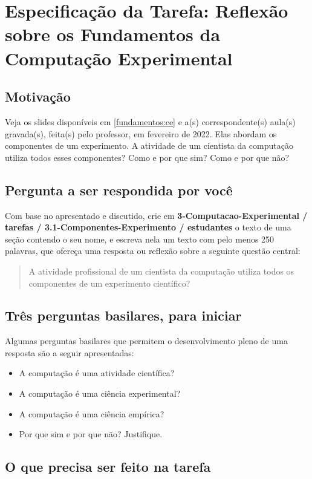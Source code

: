 \section{Especificação da Tarefa: Reflexão sobre os Fundamentos da Computação Experimental}

\subsection{Motivação}

Veja os slides disponíveis em \ref{fundamentos:ce} e a(s) correspondente(s) aula(s) gravada(s), feita(s) pelo professor, em fevereiro de 2022. Elas abordam os componentes de um experimento. A atividade de um cientista da computação utiliza todos esses componentes? Como e por que sim? Como e por que não? 

\subsection{Pergunta a ser respondida por você}

Com base no apresentado e discutido, crie em \textbf{3-Computacao-Experimental / tarefas / 3.1-Componentes-Experimento / estudantes} o texto de uma seção contendo o seu nome, e escreva nela um texto com pelo menos 250 palavras, que ofereça uma resposta ou reflexão sobre a seguinte questão central:
\begin{quote}
A atividade profissional de um cientista da computação utiliza todos os componentes de um experimento científico?
\end{quote}

\subsection{Três perguntas basilares, para iniciar}

Algumas perguntas basilares que permitem o desenvolvimento pleno de uma resposta são a seguir apresentadas:
\begin{itemize}
    \item A computação é uma atividade científica? 
    \item A computação é uma ciência experimental? 
    \item A computação é uma ciência empírica? 
    \item Por que sim e por que não? 
Justifique. 
\end{itemize}

\subsection{O que precisa ser feito na tarefa}

